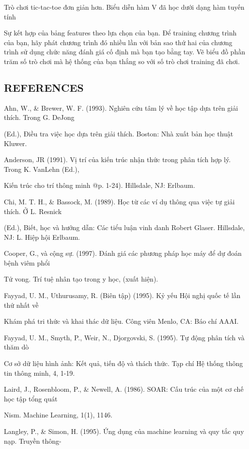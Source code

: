 Trò chơi tic-tac-toe đơn giản hơn. Biểu diễn hàm V đã học dưới dạng hàm tuyến tính

Sự kết hợp của bảng features theo lựa chọn của bạn. Để training chương trình của bạn, hãy phát chương trình đó nhiều lần với bản sao thứ hai của chương trình sử dụng chức năng đánh giá cố định mà bạn tạo bằng tay. Vẽ biểu đồ phần trăm số trò chơi mà hệ thống của bạn thắng so với số trò chơi training đã chơi.

\subsection{REFERENCES}

Ahn, W., \& Brewer, W. F. (1993). Nghiên cứu tâm lý về học tập dựa trên giải thích. Trong G. DeJong

(Ed.), Điều tra việc học dựa trên giải thích. Boston: Nhà xuất bản học thuật Kluwer.

Anderson, JR (1991). Vị trí của kiến ​​trúc nhận thức trong phân tích hợp lý. Trong K. VanLehn (Ed.),

Kiến trúc cho trí thông minh @p. 1-24). Hillsdale, NJ: Erlbaum.

Chi, M. T. H., \& Bassock, M. (1989). Học từ các ví dụ thông qua việc tự giải thích. Ở L. Resnick

(Ed.), Biết, học và hướng dẫn: Các tiểu luận vinh danh Robert Glaser. Hillsdale, NJ: L. Hiệp hội Erlbaum.

Cooper, G., và cộng sự. (1997). Đánh giá các phương pháp học máy để dự đoán bệnh viêm phổi

Tử vong. Trí tuệ nhân tạo trong y học, (xuất hiện).

Fayyad, U. M., Uthurusamy, R. (Biên tập) (1995). Kỷ yếu Hội nghị quốc tế lần thứ nhất về

Khám phá tri thức và khai thác dữ liệu. Công viên Menlo, CA: Báo chí AAAI.

Fayyad, U. M., Smyth, P., Weir, N., Djorgovski, S. (1995). Tự động phân tích và thăm dò

Cơ sở dữ liệu hình ảnh: Kết quả, tiến độ và thách thức. Tạp chí Hệ thống thông tin thông minh, 4, 1-19.

Laird, J., Rosenbloom, P., \& Newell, A. (1986). SOAR: Cấu trúc của một cơ chế học tập tổng quát

Nism. Machine Learning, 1(1), 1146.

Langley, P., \& Simon, H. (1995). Ứng dụng của machine learning và quy tắc quy nạp. Truyền thông-

